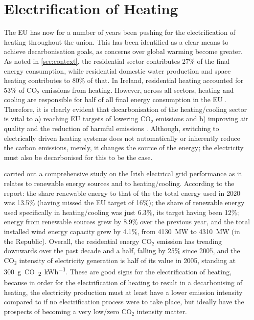 \section{Electrification of Heating}
The EU has now for a number of years been pushing for the electrification of heating throughout the union. This has been identified as a clear means to achieve decarbonisation goals, as concerns over global warming become greater. As noted in \cref{sec:context}, the residential sector contributes 27\% of the final energy consumption, while residential domestic water production and space heating contributes to 80\% of that. In Ireland, residential heating accounted for 53\% of $\text{CO}_2$ emissions from heating. However, across all sectors, heating and cooling are responsible for half of all final energy consumption in the EU \cite{an2016strategy}. Therefore, it is clearly evident that decarbonisation of the heating/cooling sector is vital to a) reaching EU targets of lowering $\text{CO}_2$ emissions and b) improving air quality and the reduction of harmful emissions \cite{epri2018us}. Although, switching to electrically driven heating systems does not automatically or inherently reduce the carbon emissions, merely, it changes the source of the energy; the electricity must also be decarbonised for this to be the case. 

\citeauthor{seai_energy_2021} \cite{seai_energy_2021} carried out a comprehensive study on the Irish electrical grid performance as it relates to renewable energy sources and to heating/cooling. According to the report: the share renewable energy to that of the the total energy used in 2020 was 13.5\% (having missed the EU target of 16\%); the share of renewable energy used specifically in heating/cooling was just 6.3\%, its target having been 12\%; energy from renewable sources grew by 8.9\% over the previous year, and the total installed wind energy capacity grew by 4.1\%, from \SI{4130}{\mega\watt} to \SI{4310}{\mega\watt} (in the Republic). Overall, the residential energy $\text{CO}_2$ emission has trending downwards over the past decade and a half, falling by 25\% since 2005, and the $\text{CO}_2$ intensity of electricity generation is half of its value in 2005, standing at \SI{300}{\gram CO\textsubscript{2}\per\kWh}. These are good signs for the electrification of heating, because in order for the electrification of heating to result in a decarbonising of heating, the electricity production must at least have a lower emission intensity compared to if no electrification process were to take place, but ideally have the prospects of becoming a very low/zero $\text{CO}_2$ intensity matter.

